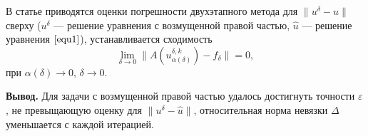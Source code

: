 В статье \cite{VasSkur2017} приводятся оценки погрешности двухэтапного метода для $\|u^{\delta}-\hat{u}\|$ сверху ($u^{\delta}$ --- решение уравнения с возмущенной правой частью, $\hat{u}$ --- решение уравнения $\eqref{equ1}$), устанавливается сходимость $$\lim_{\delta\to 0}\|A(u_{\alpha(\delta)}^{\delta, k})-f_\delta\|=0,$$ при $\alpha(\delta)\to 0$, $\delta\to 0$. 

{\bfseries\large Вывод.} Для задачи с возмущенной правой частью удалось достигнуть точности $\varepsilon$, не превыщающую оценку для $\|u^{\delta}-\hat{u}\|$, относительная норма невязки $\Delta$ уменьшается с каждой итерацией. 


